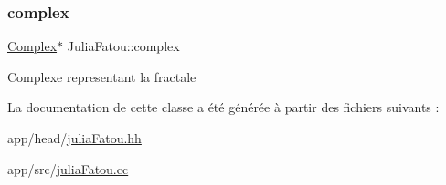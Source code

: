 \subsubsection{\texorpdfstring{complex}{complex}}
{\footnotesize\ttfamily \hyperlink{classComplex}{Complex}$\ast$ Julia\+Fatou\+::complex\hspace{0.3cm}{\ttfamily [private]}}

Complexe representant la fractale 

La documentation de cette classe a été générée à partir des fichiers suivants \+:\begin{DoxyCompactItemize}
\item 
app/head/\hyperlink{juliaFatou_8hh}{julia\+Fatou.\+hh}\item 
app/src/\hyperlink{juliaFatou_8cc}{julia\+Fatou.\+cc}\end{DoxyCompactItemize}
